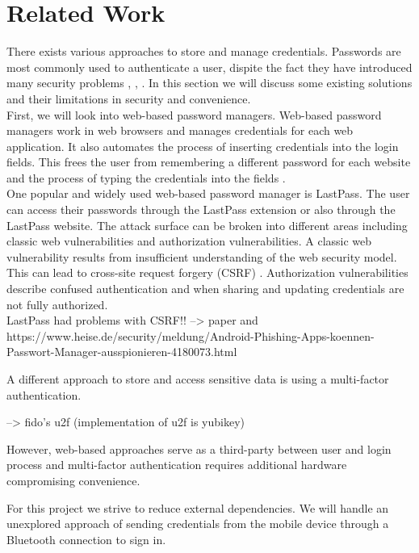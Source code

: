 \section{Related Work} \label{relwork}

There exists various approaches to store and manage credentials. Passwords are most commonly used to authenticate a user, dispite the fact they have introduced many security problems \cite{}, \cite{}, \cite{}. In this section we will discuss some existing solutions and their limitations in security and convenience. \\

First, we will look into web-based password managers. Web-based password managers work in web browsers and manages credentials for each web application. It also automates the process of inserting credentials into the login fields. This frees the user from remembering a different password for each website and the process of typing the credentials into the fields \cite{DBLP:conf/uss/LiHAS14}. \\ %
One popular and widely used web-based password manager is LastPass. The user can access their passwords through the LastPass extension or also through the LastPass website. The attack surface can be broken into different areas including classic web vulnerabilities and authorization vulnerabilities. A classic web vulnerability results from insufficient understanding of the web security model. This can lead to cross-site request forgery (CSRF) \cite{DBLP:conf/uss/LiHAS14}. Authorization vulnerabilities describe confused authentication and when sharing and updating credentials are not fully authorized. \\
LastPass had problems with CSRF!! --> paper and 
https://www.heise.de/security/meldung/Android-Phishing-Apps-koennen-Passwort-Manager-ausspionieren-4180073.html

A different approach to store and access sensitive data is using a multi-factor authentication. 


--> fido's u2f (implementation of u2f is yubikey) 


%
%
%


However, web-based approaches serve as a third-party between user and login process and multi-factor authentication requires additional hardware compromising convenience.

For this project we strive to reduce external dependencies. We will handle an unexplored approach of sending credentials from the mobile device through a Bluetooth connection to sign in.

